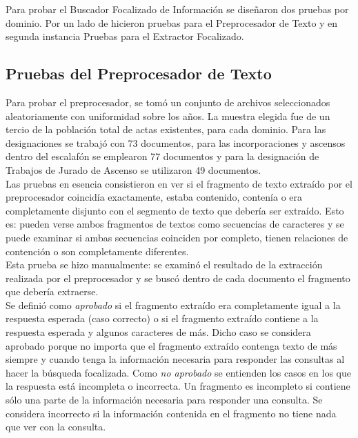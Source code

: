 Para probar el Buscador Focalizado de Información se diseñaron dos pruebas por dominio. Por un lado de hicieron pruebas para el Preprocesador de Texto y en segunda instancia Pruebas para el Extractor Focalizado. 

\subsection{Pruebas del Preprocesador de Texto}

Para probar el preprocesador, se tomó un conjunto de archivos seleccionados aleatoriamente con uniformidad sobre los años. La muestra elegida fue de un tercio de la población total de actas existentes, para cada dominio. Para las designaciones se trabajó con 73 documentos, para las incorporaciones y ascensos dentro del escalafón se emplearon 77 documentos y para la designación de Trabajos de Jurado de Ascenso se utilizaron 49 documentos. \\

Las pruebas en esencia consistieron en ver si el fragmento de texto extraído por el preprocesador coincidía exactamente, estaba contenido, contenía o era completamente disjunto con el segmento de texto que debería ser extraído. Esto es: pueden verse ambos fragmentos de textos como secuencias de caracteres y se puede examinar si ambas secuencias coinciden por completo, tienen relaciones de contención o son completamente diferentes. \\

Esta prueba se hizo manualmente: se examinó el resultado de la extracción realizada por el preprocesador y se buscó dentro de cada documento el fragmento que debería extraerse. \\

Se definió como \emph{aprobado} si el fragmento extraído era completamente igual a la respuesta esperada (caso correcto) o si el fragmento extraído contiene a la respuesta esperada y algunos caracteres de más. Dicho caso se considera aprobado porque no importa que el fragmento extraído contenga texto de más siempre y cuando tenga la información necesaria para responder las consultas al hacer la búsqueda focalizada. Como \emph{no aprobado} se entienden los casos en los que la respuesta está incompleta o incorrecta. Un fragmento es incompleto si contiene sólo una parte de la información necesaria para responder una consulta. Se considera incorrecto si la información contenida en el fragmento no tiene nada que ver con la consulta. \\

